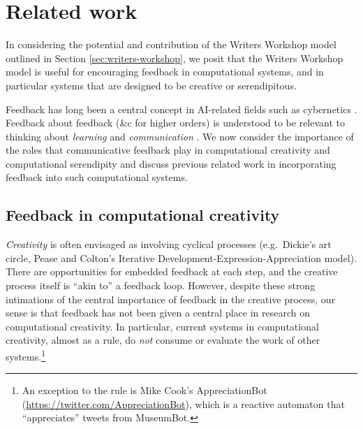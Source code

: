 \section{Related work}\label{sec:ww-related}


In considering the potential and contribution of the Writers Workshop model outlined in Section \ref{sec:writers-workshop}, we posit that the Writers Workshop model is useful for encouraging feedback in computational systems, and in particular systems that are designed to be creative or serendipitous. 

Feedback has long been a central concept in AI-related fields such as cybernetics \cite{ashby1952,seth2015cybernetic}. Feedback about feedback (\&c for higher orders) is understood to be
relevant to thinking about \emph{learning} and \emph{communication}
\cite{bateson+steps+2000}. We now consider the importance of the roles that communicative feedback play in computational creativity and computational serendipity and discuss previous related work in incorporating feedback into such computational systems.



\subsection{Feedback in computational creativity} \label{ref:related-computational-creativity}

\emph{Creativity} is often envisaged as involving cyclical processes
(e.g.~Dickie's \citeyear{dickie1984art} art circle, Pease and Colton's
\citeyear{pease2011computational} Iterative
Development-Expression-Appreciation model).  There are opportunities
for embedded feedback at each step, and the creative process itself is ``akin
to'' a feedback loop.  However, despite these strong intimations of
the central importance of feedback in the creative process, our sense
is that feedback has not been given a central place in research on
computational creativity.  In particular, current systems in
computational creativity, almost as a rule, do \emph{not} consume or
evaluate the work of other systems.\footnote{An exception to
  the rule is Mike Cook's {\sf AppreciationBot}
  (\url{https://twitter.com/AppreciationBot}), which is a reactive
  automaton that ``appreciates'' tweets from {\sf MuseumBot}.}

